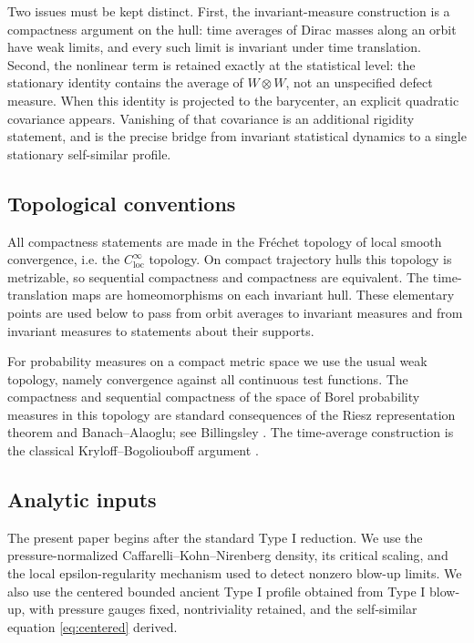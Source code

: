 \documentclass[11pt]{amsart}
\theoremstyle{plain}
\theoremstyle{definition}
\theoremstyle{remark}
\numberwithin{equation}{section}
\begin{document}
Two issues must be kept distinct.  First, the invariant-measure construction
is a compactness argument on the hull: time averages of Dirac masses along an
orbit have weak limits, and every such limit is invariant under time
translation.  Second, the nonlinear term is retained exactly at the
statistical level: the stationary identity contains the average of
\(W\otimes W\), not an unspecified defect measure.  When this identity is
projected to the barycenter, an explicit quadratic covariance appears.
Vanishing of that covariance is an additional rigidity statement, and is the
precise bridge from invariant statistical dynamics to a single stationary
self-similar profile.

\subsection{Topological conventions}

All compactness statements are made in the Fr\'echet topology of local smooth
convergence, i.e. the \(C^\infty_{\mathrm{loc}}\) topology.  On compact
trajectory hulls this topology is metrizable, so sequential compactness and
compactness are equivalent.  The time-translation maps are homeomorphisms on
each invariant hull.  These elementary points are used below to pass from
orbit averages to invariant measures and from invariant measures to statements
about their supports.

For probability measures on a compact metric space we use the usual weak
topology, namely convergence against all continuous test functions.  The
compactness and sequential compactness of the space of Borel probability
measures in this topology are standard consequences of the Riesz
representation theorem and Banach--Alaoglu; see Billingsley
\cite{Billingsley1999}.  The time-average construction is the classical
Kryloff--Bogoliouboff argument \cite{KryloffBogoliouboff1937}.

\subsection{Analytic inputs}

The present paper begins after the standard Type I reduction.  We use the
pressure-normalized Caffarelli--Kohn--Nirenberg density, its critical scaling,
and the local epsilon-regularity mechanism used to detect nonzero blow-up
limits.  We also use the centered bounded ancient Type I profile obtained from
Type I blow-up, with pressure gauges fixed, nontriviality retained, and the
self-similar equation \eqref{eq:centered} derived.
\end{document}
